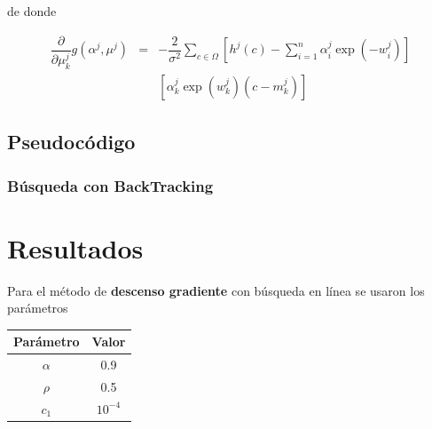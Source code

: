 \documentclass[11pt,letterpaper]{article}
\theoremstyle{definition}
\theoremstyle{definition}
\theoremstyle{definition}
\begin{document}
\normalsize{de donde}
\begin{shaded*}
\footnotesize {
	\begin{eqnarray*}
			\dfrac{\partial }{\partial \mu_k^j} g(\alpha^j, \mu^j) & = &
			- \dfrac{2}{\sigma^2} \sum_{c\in \Omega} \left[ h^j (c) - \sum_{i = 1}^n \alpha_i^j \exp(-w_i^j)
			 \right] \\
			 &  &
			\left[ \alpha_k^j \exp(w_k^j) (c - m_k^j) \right]
	\end{eqnarray*}
}
\end{shaded*}
\subsection{Pseudocódigo}
\subsubsection{Búsqueda con BackTracking}
\begin{shaded*}
	\begin{algorithmic}[1]
		\EndWhile
	\end{algorithmic}
\end{shaded*}

\section{Resultados}
Para el método de \textbf{descenso gradiente} con  búsqueda en línea se usaron los parámetros
\begin{center}
	\begin{tabular}{cc}
		\hline
		Parámetro & Valor \\
		\hline
		$\alpha $ & 0.9 \\
		$ \rho $  & 0.5 \\
		$ c_1 $ & $ 10^{-4} $ \\
		\hline
	\end{tabular}
\end{center}
\end{document}
